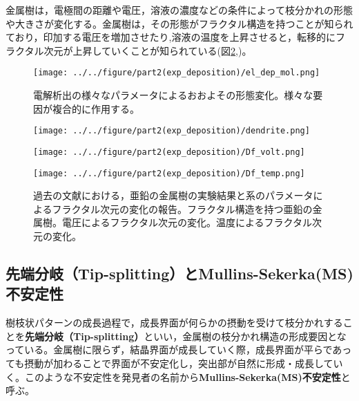 \documentclass[autodetect-engine,dvi=dvipdfmx,a4paper,ja=standard,oneside,openany,11pt]{bxjsbook}
\begin{document}
金属樹は，電極間の距離や電圧，溶液の濃度などの条件によって枝分かれの形態や大きさが変化する。金属樹は，その形態がフラクタル構造を持つことが知られており，印加する電圧を増加させたり\cite{matsushita1984fractal},溶液の温度を上昇させると\cite{suda2003temperature}，転移的にフラクタル次元が上昇していくことが知られている(図\ref{fig:fractal_dimension},)。
\begin{figure}[htbp]
  \centering
  \texttt{[image: ../../figure/part2(exp\_deposition)/el\_dep\_mol.png]}
  \caption{電解析出の様々なパラメータによるおおよその形態変化。様々な要因が複合的に作用する\cite{suda2003temperature}。}
  \label{fig:el_dep_mol}
\end{figure}

\begin{figure}[htbp]
  \begin{minipage}{0.28\textwidth}
    \subcaption{}
    \centering
    \texttt{[image: ../../figure/part2(exp\_deposition)/dendrite.png]}
    \label{fig:el_dep_fractal}
  \end{minipage}
  \begin{minipage}
    {0.35\textwidth}
    \subcaption{}
    \centering
    \texttt{[image: ../../figure/part2(exp\_deposition)/Df\_volt.png]}
    \label{fig:Df_volt}
  \end{minipage}
  \begin{minipage}
    {0.35\textwidth}
    \subcaption{}
    \centering
    \texttt{[image: ../../figure/part2(exp\_deposition)/Df\_temp.png]}
    \label{fig:Df_temp}
  \end{minipage}
  \caption{過去の文献における，亜鉛の金属樹の実験結果と系のパラメータによるフラクタル次元の変化の報告。フラクタル構造を持つ亜鉛の金属樹\cite{matsushita1984fractal}。電圧によるフラクタル次元の変化\cite{matsushita1984fractal}。温度によるフラクタル次元の変化\cite{suda2003temperature}。}
  \label{fig:fractal_dimension}
\end{figure}

\subsection{先端分岐（Tip-splitting）とMullins-Sekerka(MS)不安定性}
\label{sec:tip_splitting}
樹枝状パターンの成長過程で，成長界面が何らかの摂動を受けて枝分かれすることを\textbf{先端分岐（Tip-splitting）}といい，金属樹の枝分かれ構造の形成要因となっている。金属樹に限らず，結晶界面が成長していく際，成長界面が平らであっても摂動が加わることで界面が不安定化し，突出部が自然に形成・成長していく。このような不安定性を発見者の名前から\textbf{Mullins-Sekerka(MS)不安定性}と呼ぶ。
\end{document}
